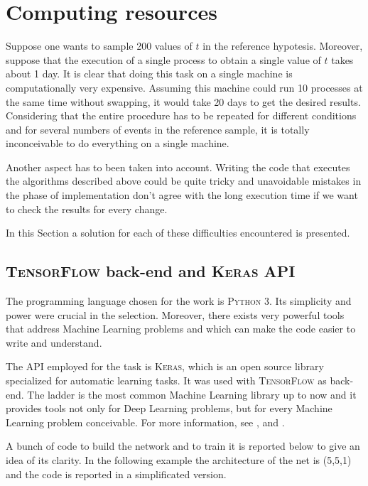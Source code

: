 \section{Computing resources}
Suppose one wants to sample 200 values of $t$ in the reference hypotesis. Moreover, suppose that the execution of a single process to obtain a single value of $t$ takes about 1 day. It is clear that doing this task on a single machine is computationally very expensive. Assuming this machine could run 10 processes at the same time without swapping, it would take 20 days to get the desired results. Considering that the entire procedure has to be repeated for different conditions and for several numbers of events in the reference sample, it is totally inconceivable to do everything on a single machine.

Another aspect has to been taken into account. Writing the code that executes the algorithms described above could be quite tricky and unavoidable mistakes in the phase of implementation don't agree with the long execution time if we want to check the results for every change.

In this Section a solution for each of these difficulties encountered is presented.



\subsection{\textsc{TensorFlow} back-end and \textsc{Keras} API}
The programming language chosen for the work is \textsc{Python 3}. Its simplicity and power were crucial in the selection. Moreover, there exists very powerful tools that address Machine Learning problems and which can make the code easier to write and understand.

The API employed for the task is \textsc{Keras}, which is an open source library specialized for automatic learning tasks. It was used with \textsc{TensorFlow} as back-end. The ladder is the most common Machine Learning library up to now and it provides tools not only for Deep Learning problems, but for every Machine Learning problem conceivable. For more information, see \cite{python}, \cite{keras} and \cite{tensorflow}.

A bunch of code to build the network and to train it is reported below to give an idea of its clarity. In the following example the architecture of the net is (5,5,1) and the code is reported in a simplificated version.

